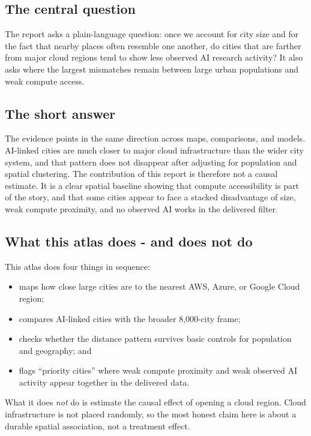 \documentclass[11pt]{article}
\begin{document}
\subsection{The central question}
The report asks a plain-language question: once we account for city size and for the fact that nearby places often resemble one another, do cities that are farther from major cloud regions tend to show less observed AI research activity? It also asks where the largest mismatches remain between large urban populations and weak compute access.

\subsection{The short answer}
The evidence points in the same direction across maps, comparisons, and models. AI-linked cities are much closer to major cloud infrastructure than the wider city system, and that pattern does not disappear after adjusting for population and spatial clustering. The contribution of this report is therefore not a causal estimate. It is a clear spatial baseline showing that compute accessibility is part of the story, and that some cities appear to face a stacked disadvantage of size, weak compute proximity, and no observed AI works in the delivered filter.

\subsection{What this atlas does - and does not do}
This atlas does four things in sequence:
\begin{itemize}[leftmargin=*]
  \item maps how close large cities are to the nearest AWS, Azure, or Google Cloud region;
  \item compares AI-linked cities with the broader 8,000-city frame;
  \item checks whether the distance pattern survives basic controls for population and geography; and
  \item flags ``priority cities'' where weak compute proximity and weak observed AI activity appear together in the delivered data.
\end{itemize}

What it does \emph{not} do is estimate the causal effect of opening a cloud region. Cloud infrastructure is not placed randomly, so the most honest claim here is about a durable spatial association, not a treatment effect.
\end{document}
